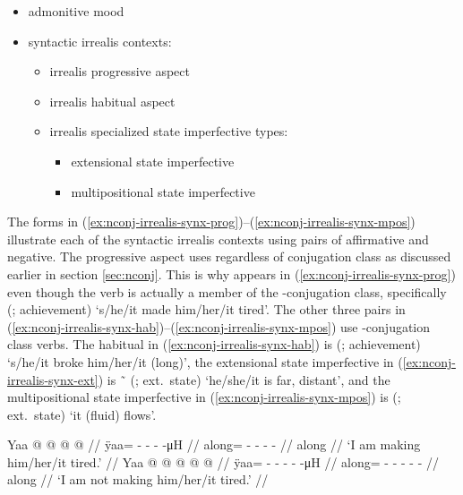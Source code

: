 \begin{multicols}{2}
\begin{itemize}[leftmargin=0.75em]\raggedyright
\item	admonitive mood 
\item	syntactic irrealis contexts:
	\begin{itemize}
	\item	irrealis progressive aspect 
	\item	irrealis habitual aspect 
	\item	irrealis specialized state imperfective types:
		\begin{itemize}
		\item	extensional state imperfective 
		\item	multipositional state imperfective 
		\end{itemize}
	\end{itemize}
\end{itemize}

The forms in (\ref{ex:nconj-irrealis-synx-prog})–(\ref{ex:nconj-irrealis-synx-mpos}) illustrate each of the syntactic irrealis contexts using pairs of affirmative and negative.
The progressive aspect uses  regardless of conjugation class as discussed earlier in section \ref{sec:nconj}.
This is why  appears in (\ref{ex:nconj-irrealis-synx-prog}) even though the verb is actually a member of the -conjugation class, specifically  (; achievement) ‘s/he/it made him/her/it tired’.
The other three pairs in (\ref{ex:nconj-irrealis-synx-hab})–(\ref{ex:nconj-irrealis-synx-mpos}) use -conjugation class verbs.
The habitual in (\ref{ex:nconj-irrealis-synx-hab}) is  (; achievement) ‘s/he/it broke him/her/it (long)’,
the extensional state imperfective in (\ref{ex:nconj-irrealis-synx-ext}) is  \~\  (;  ext.\ state) ‘he/she/it is far, distant’,
and the multipositional state imperfective in (\ref{ex:nconj-irrealis-synx-mpos}) is  (;  ext.\ state) ‘it (fluid) flows’.

\pex\label{ex:nconj-irrealis-synx-prog}%
\a\label{ex:nconj-irrealis-synx-prog-aff}%
%
\begingl
	\gla	Yaa  @ {} @ {} @ {} @ {} //
	\glb	ÿaa= - - -  -μH //
	\glc	along= - - -  - //
	\gld	along  {} {} {} {} //
	\glft	‘I am making him/her/it tired.’
		//
\endgl
\a\label{ex:nconj-irrealis-synx-prog-neg}%
%
\begingl
	\gla	Yaa  @ {} @ {} @ {} @ {} @ {} //
	\glb	ÿaa= - - - -  -μH //
	\glc	along= - - - -  - //
	\gld	along  {} {} {} {} {} //
	\glft	‘I am not making him/her/it tired.’
		//
\endgl
\xe


\end{multicols}
